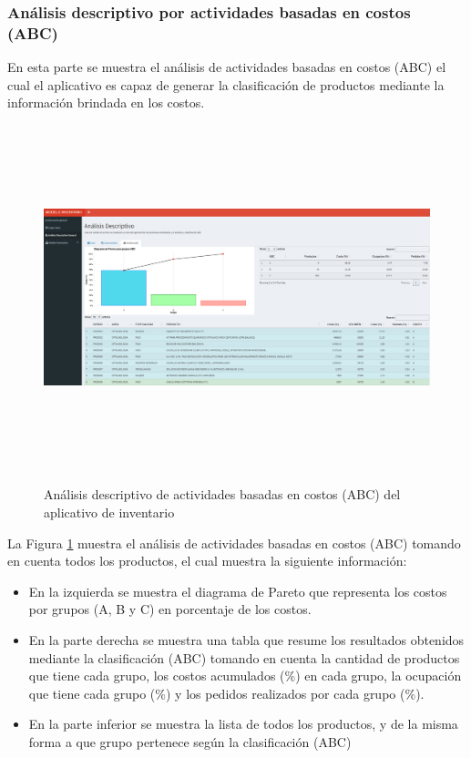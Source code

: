 \subsubsection{Análisis descriptivo por actividades basadas en costos (ABC)}
En esta parte se muestra el análisis de actividades basadas en costos (ABC) el cual el aplicativo es capaz de generar la clasificación de productos mediante la información brindada en los costos.
\clearpage
\begin{figure}[H]
  \caption{Análisis descriptivo de actividades basadas en costos (ABC) del aplicativo de inventario}
  {\includegraphics[width=16cm, height=10cm]{images/Shiny5.png}}
  \label{fig:Shiny5}
\end{figure}

La Figura \ref{fig:Shiny5} muestra el análisis de actividades basadas en costos (ABC) tomando en cuenta todos los productos, el cual muestra la siguiente información:

\begin{itemize}
  \item En la izquierda se muestra el diagrama de Pareto que representa los costos por grupos (A, B y C) en porcentaje de los costos.
  \item En la parte derecha se muestra una tabla que resume los resultados obtenidos mediante la clasificación (ABC) tomando en cuenta la cantidad de productos que tiene cada grupo, los costos acumulados ($\%$) en cada grupo, la ocupación que tiene cada grupo ($\%$) y los pedidos realizados por cada grupo ($\%$).
  \item En la parte inferior se muestra la lista de todos los productos, y de la misma forma a que grupo pertenece según la clasificación (ABC)
\end{itemize}
\clearpage
